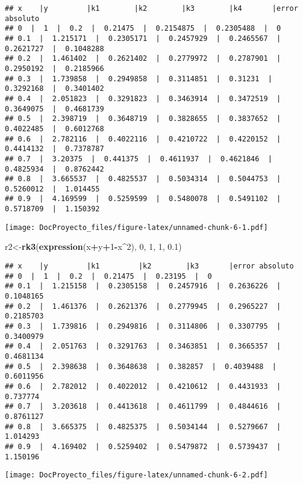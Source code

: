 \documentclass[]{article}
\newenvironment{Shaded}{\begin{snugshade}}{\end{snugshade}}
\newcommand{\KeywordTok}[1]{\textcolor[rgb]{0.13,0.29,0.53}{\textbf{#1}}}
\newcommand{\DecValTok}[1]{\textcolor[rgb]{0.00,0.00,0.81}{#1}}
\newcommand{\FloatTok}[1]{\textcolor[rgb]{0.00,0.00,0.81}{#1}}
\newcommand{\OperatorTok}[1]{\textcolor[rgb]{0.81,0.36,0.00}{\textbf{#1}}}
\newcommand{\NormalTok}[1]{#1}
\begin{document}
\begin{verbatim}
## x    |y         |k1        |k2        |k3        |k4       |error absoluto
## 0  |  1  |  0.2  |  0.21475  |  0.2154875  |  0.2305488  |  0 
## 0.1  |  1.215171  |  0.2305171  |  0.2457929  |  0.2465567  |  0.2621727  |  0.1048288 
## 0.2  |  1.461402  |  0.2621402  |  0.2779972  |  0.2787901  |  0.2950192  |  0.2185966 
## 0.3  |  1.739858  |  0.2949858  |  0.3114851  |  0.31231  |  0.3292168  |  0.3401402 
## 0.4  |  2.051823  |  0.3291823  |  0.3463914  |  0.3472519  |  0.3649075  |  0.4681739 
## 0.5  |  2.398719  |  0.3648719  |  0.3828655  |  0.3837652  |  0.4022485  |  0.6012768 
## 0.6  |  2.782116  |  0.4022116  |  0.4210722  |  0.4220152  |  0.4414132  |  0.7378787 
## 0.7  |  3.20375  |  0.441375  |  0.4611937  |  0.4621846  |  0.4825934  |  0.8762442 
## 0.8  |  3.665537  |  0.4825537  |  0.5034314  |  0.5044753  |  0.5260012  |  1.014455 
## 0.9  |  4.169599  |  0.5259599  |  0.5480078  |  0.5491102  |  0.5718709  |  1.150392
\end{verbatim}

\texttt{[image: DocProyecto\_files/figure-latex/unnamed-chunk-6-1.pdf]}

\begin{Shaded}
\begin{Highlighting}[]
\NormalTok{r2<-}\KeywordTok{rk3}\NormalTok{(}\KeywordTok{expression}\NormalTok{(x}\OperatorTok{+}\NormalTok{y}\OperatorTok{+}\DecValTok{1}\OperatorTok{-}\NormalTok{x}\OperatorTok{^}\DecValTok{2}\NormalTok{), }\DecValTok{0}\NormalTok{, }\DecValTok{1}\NormalTok{, }\DecValTok{1}\NormalTok{, }\FloatTok{0.1}\NormalTok{)}
\end{Highlighting}
\end{Shaded}

\begin{verbatim}
## x    |y         |k1         |k2        |k3       |error absoluto
## 0  |  1  |  0.2  |  0.21475  |  0.23195  |  0 
## 0.1  |  1.215158  |  0.2305158  |  0.2457916  |  0.2636226  |  0.1048165 
## 0.2  |  1.461376  |  0.2621376  |  0.2779945  |  0.2965227  |  0.2185703 
## 0.3  |  1.739816  |  0.2949816  |  0.3114806  |  0.3307795  |  0.3400979 
## 0.4  |  2.051763  |  0.3291763  |  0.3463851  |  0.3665357  |  0.4681134 
## 0.5  |  2.398638  |  0.3648638  |  0.382857  |  0.4039488  |  0.6011956 
## 0.6  |  2.782012  |  0.4022012  |  0.4210612  |  0.4431933  |  0.737774 
## 0.7  |  3.203618  |  0.4413618  |  0.4611799  |  0.4844616  |  0.8761127 
## 0.8  |  3.665375  |  0.4825375  |  0.5034144  |  0.5279667  |  1.014293 
## 0.9  |  4.169402  |  0.5259402  |  0.5479872  |  0.5739437  |  1.150196
\end{verbatim}

\texttt{[image: DocProyecto\_files/figure-latex/unnamed-chunk-6-2.pdf]}
\end{document}
